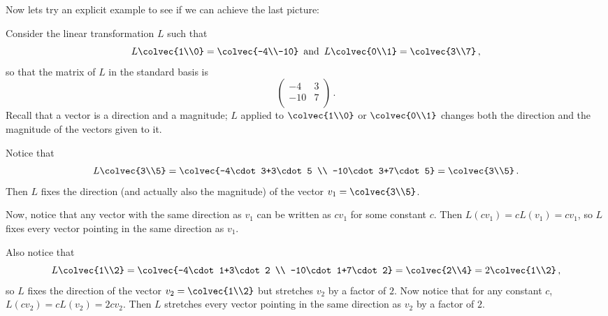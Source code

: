 Now lets try an explicit example to see if we can achieve the last picture:

\begin{example}
Consider the linear transformation $L$ such that \[L\colvec{1\\0}=\colvec{-4\\-10}\,  \mbox{ and }\, L\colvec{0\\1}=\colvec{3\\7}\, ,\] so that the matrix of $L$ in the standard basis is \[\begin{pmatrix}
-4 & 3 \\
-10 & 7 \\
\end{pmatrix}\, .\]  Recall that a vector is a direction and a magnitude; $L$ applied to $\colvec{1\\0}$ or $\colvec{0\\1}$ changes both the direction and the magnitude of the vectors given to it.

Notice that \[L\colvec{3\\5}=\colvec{-4\cdot 3+3\cdot 5 \\ -10\cdot 3+7\cdot 5}=\colvec{3\\5}\, .\]  Then $L$ fixes the  direction (and actually also the magnitude) of the vector $v_1=\colvec{3\\5}$.  





Now, notice that any vector with the same direction as $v_1$ can be written as $cv_1$ for some constant $c$.  Then $L(cv_1)=cL(v_1)=cv_1$, so $L$ fixes every vector pointing in the same direction as $v_1$.

Also notice that \[L\colvec{1\\2}=\colvec{-4\cdot 1+3\cdot 2 \\ -10\cdot 1+7\cdot 2}=\colvec{2\\4}=2\colvec{1\\2}\, ,\] so $L$ fixes the direction of the vector $v_2=\colvec{1\\2}$ but stretches $v_2$ by a factor of $2$.  Now notice that for any constant $c$, $L(cv_2)=cL(v_2)=2cv_2$.  Then $L$ stretches every vector pointing in the same direction as $v_2$ by a factor of $2$.

\end{example}

